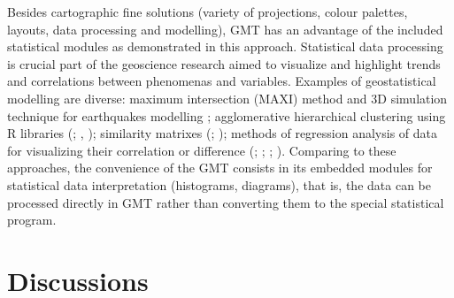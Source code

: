 \documentclass[USenglish]{article}
\begin{document}
Besides cartographic fine solutions (variety of projections, colour palettes, layouts, data processing and modelling), GMT has an advantage of the included statistical modules as demonstrated in this approach. Statistical data processing is crucial part of the geoscience research aimed to visualize and highlight trends and correlations between phenomenas and variables. Examples of geostatistical modelling are diverse: maximum intersection (MAXI) method and 3D simulation technique for earthquakes modelling \citep{Theunissen}; agglomerative hierarchical clustering using R libraries (\cite{Herod}; \cite{Lemenkova201868}, \cite{Lemenkova201992}); similarity matrixes (\cite{Nunouraetal2015}; \cite{Lemenkova201871}); methods of regression analysis of data for visualizing their correlation or difference (\cite{Abrehdary}; \cite{Lemenkova201904}; \cite{Lemenkova201988}; \cite{Marcheseetal2017}). Comparing to these approaches, the convenience of the GMT consists in its embedded modules for statistical data interpretation (histograms, diagrams), that is, the data can be processed directly in GMT rather than converting them to the special statistical program. 

\section{Discussions}
\end{document}
